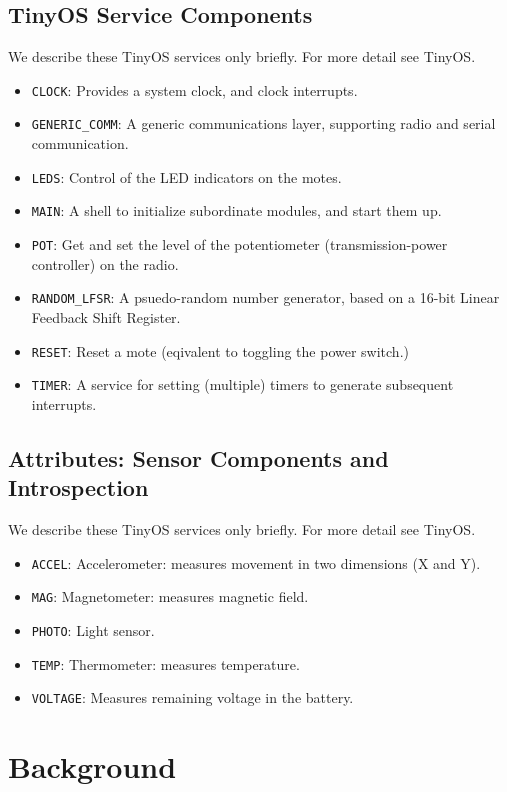 \documentclass[11pt]{article}
\begin{document}
\subsection{TinyOS Service Components}
We describe these TinyOS services only briefly.  For more detail see
TinyOS.
\begin{itemize}
\item {\tt CLOCK}: Provides a system clock, and clock interrupts.
\item {\tt GENERIC\_COMM}: A generic communications layer, supporting
  radio and serial communication.
\item {\tt LEDS}: Control of the LED indicators on the motes.
\item {\tt MAIN}: A shell to initialize subordinate modules, and start
  them up.
\item {\tt POT}: Get and set the level of the potentiometer
  (transmission-power controller) on the radio.
\item {\tt RANDOM\_LFSR}: A psuedo-random number generator, based on a
  16-bit Linear Feedback Shift Register.
\item {\tt RESET}:  Reset a mote (eqivalent to toggling the 
power switch.)
\item {\tt TIMER}: A service for setting (multiple) timers to generate
  subsequent interrupts.
\end{itemize}

\subsection{Attributes: Sensor Components and Introspection}
\label{sec:devices}
We describe these TinyOS services only briefly.  For more detail see
TinyOS.
\begin{itemize}
\item {\tt ACCEL}: Accelerometer: measures movement in two dimensions
  (X and Y).
\item {\tt MAG}: Magnetometer: measures magnetic field.
\item {\tt PHOTO}: Light sensor.
\item {\tt TEMP}: Thermometer: measures temperature.
\item {\tt VOLTAGE}: Measures remaining voltage in the battery.
\end{itemize}
\section{Background}
\end{document}
